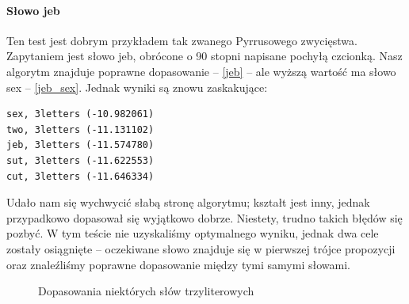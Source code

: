 \documentclass[a4paper,12pt,leqno]{article}
\begin{document}
\paragraph{Słowo jeb}
Ten test jest dobrym przykładem tak zwanego Pyrrusowego zwycięstwa. Zapytaniem jest słowo jeb, obrócone o 90 stopni napisane pochyłą czcionką.
Nasz algorytm znajduje poprawne dopasowanie -- \ref{jeb} -- ale wyższą wartość ma słowo sex -- \ref{jeb_sex}.
Jednak wyniki są znowu zaskakujące:
\begin{verbatim}
sex, 3letters (-10.982061)
two, 3letters (-11.131102)
jeb, 3letters (-11.574780)
sut, 3letters (-11.622553)
cut, 3letters (-11.646334)
\end{verbatim}
Udało nam się wychwycić słabą stronę algorytmu; kształt jest inny, jednak przypadkowo dopasował się wyjątkowo dobrze. Niestety, trudno takich błędów się pozbyć. W tym teście nie uzyskaliśmy 
optymalnego wyniku, jednak dwa cele zostały osiągnięte -- oczekiwane słowo znajduje się w pierwszej trójce propozycji oraz znaleźliśmy poprawne dopasowanie między tymi samymi słowami.


\begin{figure}\centering
{}\hspace{5mm}
\caption{Dopasowania niektórych słów trzyliterowych}
\end{figure}
\end{document}
